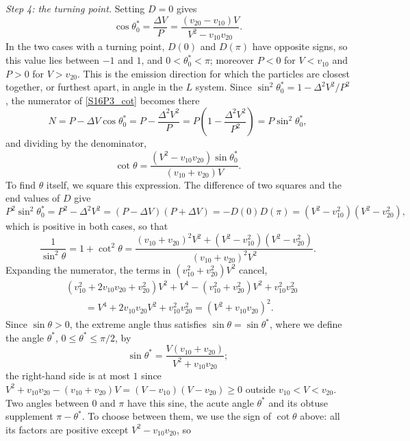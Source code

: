 \begin{problem}[title={Range of angles between two decay products}]
{\textit{Step 4: the turning point.} Setting $D=0$ gives
\begin{equation*}
    \cos{\theta_0^*} = \frac{\Delta V}{P} = \frac{(v_{20}-v_{10})V}{V^2-v_{10}v_{20}}.
\end{equation*}
In the two cases with a turning point, $D(0)$ and $D(\pi)$ have opposite signs, so this value lies between $-1$ and $1$, and $0<\theta_0^*<\pi$; moreover $P<0$ for $V<v_{10}$ and $P>0$ for $V>v_{20}$. This is the emission direction for which the particles are closest together, or furthest apart, in angle in the $L$ system. Since $\sin^2{\theta_0^*} = 1 - \Delta^2V^2/P^2$, the numerator of \eqref{S16P3_cot} becomes there
\begin{equation*}
    N = P - \Delta V\cos{\theta_0^*} = P - \frac{\Delta^2V^2}{P} = P\left(1 - \frac{\Delta^2V^2}{P^2}\right) = P\sin^2{\theta_0^*},
\end{equation*}
and dividing by the denominator,
\begin{equation*}
    \cot{\theta} = \frac{(V^2-v_{10}v_{20})\sin{\theta_0^*}}{(v_{10}+v_{20})V}.
\end{equation*}
To find $\theta$ itself, we square this expression. The difference of two squares and the end values of $D$ give
\begin{equation*}
    P^2\sin^2{\theta_0^*} = P^2 - \Delta^2V^2 = (P-\Delta V)(P+\Delta V) = -D(0)D(\pi) = (V^2-v_{10}^2)(V^2-v_{20}^2),
\end{equation*}
which is positive in both cases, so that
\begin{equation*}
    \frac{1}{\sin^2{\theta}} = 1 + \cot^2{\theta} = \frac{(v_{10}+v_{20})^2V^2 + (V^2-v_{10}^2)(V^2-v_{20}^2)}{(v_{10}+v_{20})^2V^2}.
\end{equation*}
Expanding the numerator, the terms in $(v_{10}^2+v_{20}^2)V^2$ cancel,
\begin{align*}
    &(v_{10}^2+2v_{10}v_{20}+v_{20}^2)V^2 + V^4 - (v_{10}^2+v_{20}^2)V^2 + v_{10}^2v_{20}^2 \\
    &\qquad = V^4 + 2v_{10}v_{20}V^2 + v_{10}^2v_{20}^2 = (V^2+v_{10}v_{20})^2.
\end{align*}
Since $\sin{\theta}>0$, the extreme angle thus satisfies $\sin{\theta} = \sin{\theta^*}$, where we define the angle $\theta^*$, $0 \leq \theta^* \leq \pi/2$, by
\begin{equation}
    \sin{\theta^*} = \frac{V(v_{10}+v_{20})}{V^2 + v_{10}v_{20}}; \label{S16P3_theta0}
\end{equation}
the right-hand side is at most $1$ since $V^2 + v_{10}v_{20} - (v_{10}+v_{20})V = (V-v_{10})(V-v_{20}) \geq 0$ outside $v_{10}<V<v_{20}$. Two angles between $0$ and $\pi$ have this sine, the acute angle $\theta^*$ and its obtuse supplement $\pi-\theta^*$. To choose between them, we use the sign of $\cot{\theta}$ above: all its factors are positive except $V^2-v_{10}v_{20}$, so
}
\end{problem}
